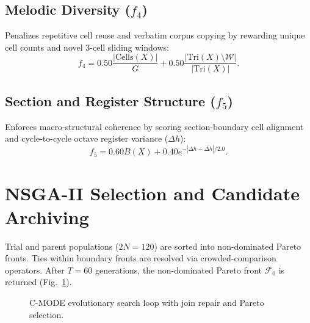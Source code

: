 \documentclass[12pt,a4paper]{report}
\begin{document}
\subsection{Melodic Diversity ($f_4$)}
Penalizes repetitive cell reuse and verbatim corpus copying by rewarding unique cell counts and novel 3-cell sliding windows:
\begin{equation}
 f_4 = 0.50 \frac{|\text{Cells}(X)|}{G} + 0.50 \frac{|\text{Tri}(X) \setminus \mathcal{W}|}{|\text{Tri}(X)|}.
\end{equation}

\subsection{Section and Register Structure ($f_5$)}
Enforces macro-structural coherence by scoring section-boundary cell alignment and cycle-to-cycle octave register variance ($\Delta h$):
\begin{equation}
 f_5 = 0.60 B(X) + 0.40 e^{-{|\Delta h - \overline{\Delta h}|}/{2.0}}.
\end{equation}

\section{NSGA-II Selection and Candidate Archiving}
Trial and parent populations ($2N = 120$) are sorted into non-dominated Pareto fronts. Ties within boundary fronts are resolved via crowded-comparison operators. After $T=60$ generations, the non-dominated Pareto front $\mathcal{F}_0$ is returned (Fig.~\ref{fig:cmode_loop}).

\begin{figure}[h!]
\centering
{}
\caption{C-MODE evolutionary search loop with join repair and Pareto selection.}
\label{fig:cmode_loop}
\end{figure}
\end{document}
